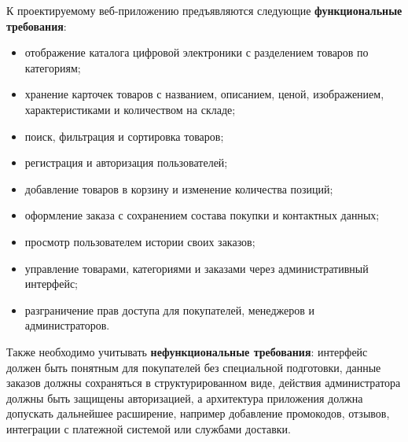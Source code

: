 К проектируемому веб-приложению предъявляются следующие \textbf{функциональные требования}:
\begin{itemize}
    \item отображение каталога цифровой электроники с разделением товаров по категориям;
    \item хранение карточек товаров с названием, описанием, ценой, изображением, характеристиками и количеством на складе;
    \item поиск, фильтрация и сортировка товаров;
    \item регистрация и авторизация пользователей;
    \item добавление товаров в корзину и изменение количества позиций;
    \item оформление заказа с сохранением состава покупки и контактных данных;
    \item просмотр пользователем истории своих заказов;
    \item управление товарами, категориями и заказами через административный интерфейс;
    \item разграничение прав доступа для покупателей, менеджеров и администраторов.
\end{itemize}

Также необходимо учитывать \textbf{нефункциональные требования}: интерфейс должен быть понятным для покупателей без специальной подготовки, данные заказов должны сохраняться в структурированном виде, действия администратора должны быть защищены авторизацией, а архитектура приложения должна допускать дальнейшее расширение, например добавление промокодов, отзывов, интеграции с платежной системой или службами доставки.
